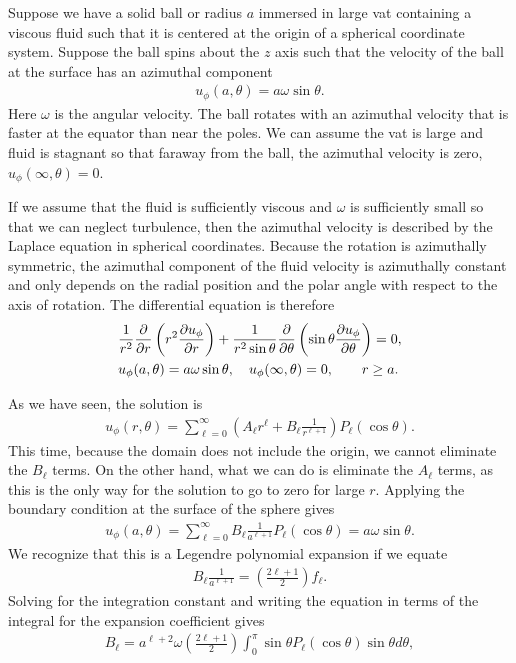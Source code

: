 Suppose we have a solid ball or radius $a$ immersed in large vat containing a viscous fluid such that it is centered at the origin of a spherical coordinate system. Suppose the ball spins about the $z$ axis such that the velocity of the ball at the surface has an azimuthal component
\begin{align}
  u_\phi(a,\theta) = a \omega \sin \theta .
\end{align}
Here $\omega$ is the angular velocity. The ball rotates with an azimuthal velocity that is faster at the equator than near the poles. We can assume the vat is large and fluid is stagnant so that faraway from the ball, the azimuthal velocity is zero, $u_\phi(\infty,\theta) = 0$.

If we assume that the fluid is sufficiently viscous and $\omega$ is sufficiently small so that we can neglect turbulence, then the azimuthal velocity is described by the Laplace equation in spherical coordinates. Because the rotation is azimuthally symmetric, the azimuthal component of the fluid velocity is azimuthally constant and only depends on the radial position and the polar angle with respect to the axis of rotation. The differential equation is therefore
\begin{align}
  &\frac{1}{r^2} \frac{ \partial {} }{ \partial {r} } \left( r^2 \frac{ \partial {u_\phi} }{ \partial {r} } \right) 
               + \frac{1}{r^2 \sin \theta } \frac{ \partial {} }{ \partial {\theta} } \left( \sin \theta \frac{ \partial {u_\phi} }{ \partial {\theta} } \right) = 0 , \nonumber \\
               &u_\phi(a,\theta) = a \omega \sin \theta, \quad u_\phi(\infty,\theta) = 0, \quad \quad r \ge a .
\end{align}

As we have seen, the solution is 
\begin{align}
  u_\phi(r,\theta) = \sum_{\ell = 0}^\infty \left( A_\ell r^\ell + B_\ell \frac{1}{r^{\ell+1}} \right) P_\ell( \cos \theta ) .
\end{align}
This time, because the domain does not include the origin, we cannot eliminate the $B_\ell$ terms. On the other hand, what we can do is eliminate the $A_\ell$ terms, as this is the only way for the solution to go to zero for large $r$. Applying the boundary condition at the surface of the sphere gives
\begin{align}
  u_\phi(a,\theta) =  \sum_{\ell = 0}^\infty B_\ell \frac{1}{a^{\ell+1}} P_\ell( \cos \theta ) = a \omega \sin \theta .
\end{align}
We recognize that this is a Legendre polynomial expansion if we equate
\begin{align}
  B_\ell \frac{1}{a^{\ell + 1}} = \left( \frac{ 2 \ell + 1 }{2 } \right) f_\ell .
\end{align}
Solving for the integration constant and writing the equation in terms of the integral for the expansion coefficient gives
\begin{align}
  B_\ell  = a^{\ell+2} \omega \left( \frac{ 2 \ell + 1 }{2 } \right) \int_0^\pi \sin \theta P_\ell(\cos \theta) \sin \theta d\theta , \nonumber
\end{align}


